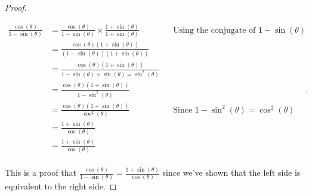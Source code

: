 \begin{proof}
  \label{prf:cos_over_1_minus_sin_equals_1_plus_sin_over_cos}

  \begin{equation*}
    \begin{alignedat}{3}
      \frac{\cos (\theta)}{1 - \sin (\theta)} &= \frac{\cos (\theta)}{1 - \sin (\theta)} \times \frac{1 + \sin (\theta)}{1 + \sin (\theta)} \qquad&& \textrm{Using the conjugate of $1 - \sin (\theta)$} \\
                                              &= \frac{\cos (\theta)(1 + \sin (\theta))}{(1 - \sin (\theta))(1 + \sin (\theta))} \\
                                              &= \frac{\cos (\theta) (1 + \sin (\theta))}{1 - \sin (\theta) + \sin (\theta) = \sin^{2} (\theta)} \\
                                              &= \frac{\cos (\theta)(1 + \sin (\theta))}{1 - \sin^{2} (\theta)} \\
                                              &= \frac{\cos (\theta)(1 + \sin (\theta))}{\cos^{2} (\theta)} \qquad&& \textrm{Since $1 - \sin^{2} (\theta) = \cos^{2} (\theta)$} \\
                                              &= \frac{1 + \sin (\theta)}{\cos (\theta)} \\
                                              &= \frac{1 + \sin (\theta)}{\cos (\theta)} \\
    \end{alignedat}
  .\end{equation*}

  This is a proof that $\frac{\cos (\theta)}{1 - \sin (\theta)} = \frac{1 +
  \sin (\theta)}{\cos (\theta)}$ since we've shown that the left side is
  equivalent to the right side.
\end{proof}

\newpage
